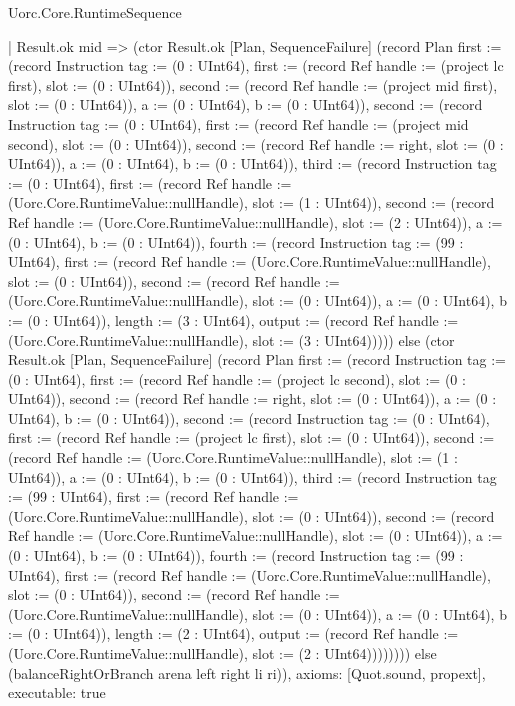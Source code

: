 \begin{lexlean}{Uorc.Core.RuntimeSequence}
\begin{semanticmodule}
{          | Result.ok mid => (ctor Result.ok [Plan, SequenceFailure] (record Plan {first := (record Instruction {tag := (0 : UInt64), first := (record Ref {handle := (project lc first), slot := (0 : UInt64)}), second := (record Ref {handle := (project mid first), slot := (0 : UInt64)}), a := (0 : UInt64), b := (0 : UInt64)}), second := (record Instruction {tag := (0 : UInt64), first := (record Ref {handle := (project mid second), slot := (0 : UInt64)}), second := (record Ref {handle := right, slot := (0 : UInt64)}), a := (0 : UInt64), b := (0 : UInt64)}), third := (record Instruction {tag := (0 : UInt64), first := (record Ref {handle := (Uorc.Core.RuntimeValue::nullHandle), slot := (1 : UInt64)}), second := (record Ref {handle := (Uorc.Core.RuntimeValue::nullHandle), slot := (2 : UInt64)}), a := (0 : UInt64), b := (0 : UInt64)}), fourth := (record Instruction {tag := (99 : UInt64), first := (record Ref {handle := (Uorc.Core.RuntimeValue::nullHandle), slot := (0 : UInt64)}), second := (record Ref {handle := (Uorc.Core.RuntimeValue::nullHandle), slot := (0 : UInt64)}), a := (0 : UInt64), b := (0 : UInt64)}), length := (3 : UInt64), output := (record Ref {handle := (Uorc.Core.RuntimeValue::nullHandle), slot := (3 : UInt64)})}))) else (ctor Result.ok [Plan, SequenceFailure] (record Plan {first := (record Instruction {tag := (0 : UInt64), first := (record Ref {handle := (project lc second), slot := (0 : UInt64)}), second := (record Ref {handle := right, slot := (0 : UInt64)}), a := (0 : UInt64), b := (0 : UInt64)}), second := (record Instruction {tag := (0 : UInt64), first := (record Ref {handle := (project lc first), slot := (0 : UInt64)}), second := (record Ref {handle := (Uorc.Core.RuntimeValue::nullHandle), slot := (1 : UInt64)}), a := (0 : UInt64), b := (0 : UInt64)}), third := (record Instruction {tag := (99 : UInt64), first := (record Ref {handle := (Uorc.Core.RuntimeValue::nullHandle), slot := (0 : UInt64)}), second := (record Ref {handle := (Uorc.Core.RuntimeValue::nullHandle), slot := (0 : UInt64)}), a := (0 : UInt64), b := (0 : UInt64)}), fourth := (record Instruction {tag := (99 : UInt64), first := (record Ref {handle := (Uorc.Core.RuntimeValue::nullHandle), slot := (0 : UInt64)}), second := (record Ref {handle := (Uorc.Core.RuntimeValue::nullHandle), slot := (0 : UInt64)}), a := (0 : UInt64), b := (0 : UInt64)}), length := (2 : UInt64), output := (record Ref {handle := (Uorc.Core.RuntimeValue::nullHandle), slot := (2 : UInt64)})})))))) else (balanceRightOrBranch arena left right li ri)),
  axioms: [Quot.sound, propext],
  executable: true
}


\end{semanticmodule}
\end{lexlean}
